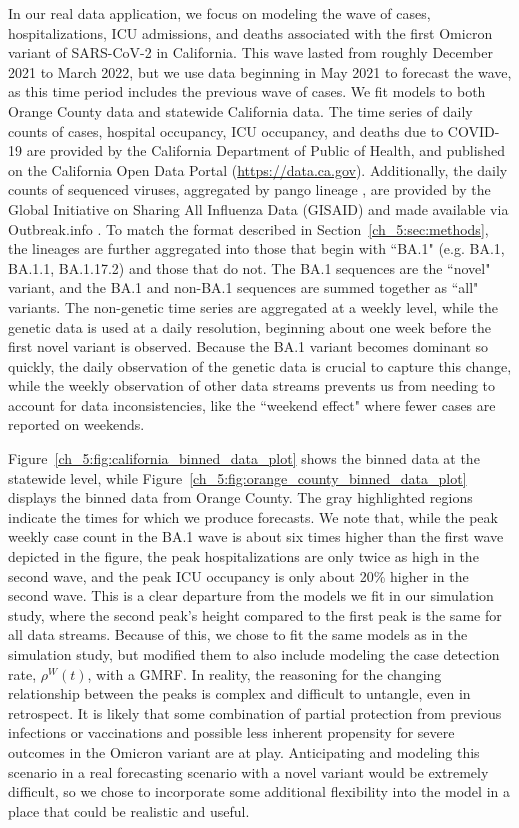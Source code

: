 In our real data application, we focus on modeling the wave of cases, hospitalizations, ICU admissions, and deaths associated with the first Omicron variant of SARS-CoV-2 in California.
This wave lasted from roughly December 2021 to March 2022, but we use data beginning in May 2021 to forecast the wave, as this time period includes the previous wave of cases.
We fit models to both Orange County data and statewide California data.
The time series of daily counts of cases, hospital occupancy, ICU occupancy, and deaths due to COVID-19 are provided by the California Department of Public of Health, and published on the California Open Data Portal (\url{https://data.ca.gov}).
Additionally, the daily counts of sequenced viruses, aggregated by pango lineage \citep{pango}, are provided by the Global Initiative on Sharing All Influenza Data (GISAID) \citep{shu2017gisaid} and made available via Outbreak.info \citep{Gangavarapu2023}.
To match the format described in Section~\ref{ch_5:sec:methods}, the lineages are further aggregated into those that begin with ``BA.1" (e.g. BA.1, BA.1.1, BA.1.17.2) and those that do not.
The BA.1 sequences are the ``novel" variant, and the BA.1 and non-BA.1 sequences are summed together as ``all" variants.
The non-genetic time series are aggregated at a weekly level, while the genetic data is used at a daily resolution, beginning about one week before the first novel variant is observed.
Because the BA.1 variant becomes dominant so quickly, the daily observation of the genetic data is crucial to capture this change, while the weekly observation of other data streams prevents us from needing to account for data inconsistencies, like the ``weekend effect" where fewer cases are reported on weekends.

Figure~\ref{ch_5:fig:california_binned_data_plot} shows the binned data at the statewide level, while Figure~\ref{ch_5:fig:orange_county_binned_data_plot} displays the binned data from Orange County.
The gray highlighted regions indicate the times for which we produce forecasts.
We note that, while the peak weekly case count in the BA.1 wave is about six times higher than the first wave depicted in the figure, the peak hospitalizations are only twice as high in the second wave, and the peak ICU occupancy is only about 20\% higher in the second wave.
This is a clear departure from the models we fit in our simulation study, where the second peak's height compared to the first peak is the same for all data streams.
Because of this, we chose to fit the same models as in the simulation study, but modified them to also include modeling the case detection rate, \( \rho^W(t) \), with a GMRF.
In reality, the reasoning for the changing relationship between the peaks is complex and difficult to untangle, even in retrospect.
It is likely that some combination of partial protection from previous infections or vaccinations and possible less inherent propensity for severe outcomes in the Omicron variant are at play.
Anticipating and modeling this scenario in a real forecasting scenario with a novel variant would be extremely difficult, so we chose to incorporate some additional flexibility into the model in a place that could be realistic and useful.

